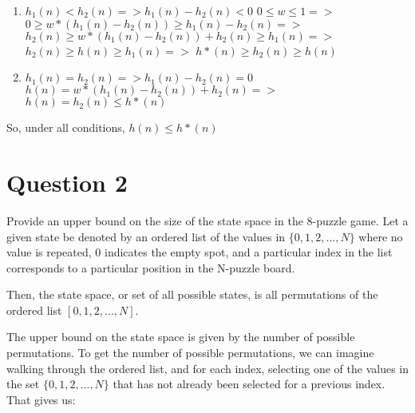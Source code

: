 \documentclass{article}
\begin{document}
\begin{enumerate}
\begin{enumerate}
            \item $h_1(n) < h_2(n) => h_1(n) - h_2(n) < 0$
            \newline
            $0 \leq w \leq 1 =>$
            \newline
            $0 \geq w * (h_1(n) - h_2(n)) \geq h_1(n) - h_2(n) =>$
            \newline
            $h_2(n) \geq w * (h_1(n) - h_2(n)) + h_2(n) \geq h_1(n) =>$
            \newline
            $h_2(n) \geq h(n) \geq h_1(n) =>$
            \newline
            $h*(n) \geq h_2(n) \geq h(n)$
            \item $h_1(n) = h_2(n) => h_1(n) - h_2(n) = 0$
            \newline
            $h(n) = w*(h_1(n) - h_2(n)) + h_2(n) => $
            \newline
            $h(n) = h_2(n) \leq h*(n)$
        \end{enumerate}
        So, under all conditions, $h(n) \leq h*(n)$
        
    \end{enumerate}
    
    
    
    \newpage
    \section*{Question 2}
    Provide an upper bound on the size of the state space in the 8-puzzle game.
    \newline
    \newline
    Let a given state be denoted by an ordered list of the values in $\{0, 1, 2, ..., N\}$ where no value is repeated, 0 indicates the empty spot, and a particular index in the list corresponds to a particular position in the N-puzzle board.\newline
    
    Then, the state space, or set of all possible states, is all permutations of the ordered list $[0,1,2,...,N]$.\newline
    
    The upper bound on the state space is given by the number of possible permutations. To get the number of possible permutations, we can imagine walking through the ordered list, and for each index, selecting one of the values in the set $\{0, 1, 2, ..., N\}$ that has not already been selected for a previous index. That gives us:\newline
    
\end{document}
